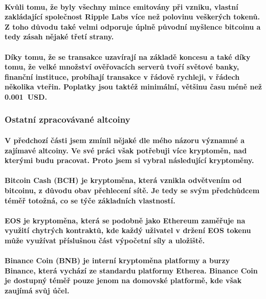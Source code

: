 \documentclass[thesis=B,czech]{FITthesis}[2019/03/21]
\begin{document}
\paragraph{
Kvůli tomu, že byly všechny mince emitovány při vzniku, vlastní zakládající společnost Ripple Labs více než polovinu veškerých tokenů. Z toho důvodu také velmi odporuje úplně původní myšlence bitcoinu a tedy zásah nějaké třetí strany. \cite{alza_ripple}
}
\paragraph{
Díky tomu, že se transakce uzavírají na základě koncesu a také díky tomu, že velké množství ověřovacích serverů tvoří světové banky, finanční instituce, probíhají transakce v řádově rychleji, v řádech několika vteřin. Poplatky jsou taktéž minimální, většinu času méně než 0.001~USD. \cite{bitinfocharts} \cite{coincodex_ripple}
}
\subsubsection{Ostatní zpracovávané altcoiny}
\paragraph{
V předchozí části jsem zmínil nějaké dle mého názoru významné a zajímavé altcoiny. Ve své práci však potřebuji více kryptoměn, nad kterými budu pracovat. Proto jsem si vybral následující kryptoměny.
}
\paragraph{
Bitcoin Cash (BCH) je kryptoměna, která vznikla odvětvením od bitcoinu, z důvodu obav přehlecení sítě. Je tedy se svým předchůdcem téměř totožná, co se týče základních vlastností. \cite{kurzy_bch}
}
\paragraph{
EOS je kryptoměna, která se podobně jako Ethereum zaměřuje na využití chytrých kontraktů, kde každý uživatel v držení EOS tokenu může využívat příslušnou část výpočetní síly a uložiště. \cite{finex_eos}
}
\paragraph{
Binance Coin (BNB) je interní kryptoměna platformy a burzy Binance, která vychází ze standardu platformy Etherea. Binance Coin je dostupný téměř pouze jenom na domovské platformě, kde však zaujímá svůj účel. \cite{martin_sistek_bnb}
}
\end{document}
